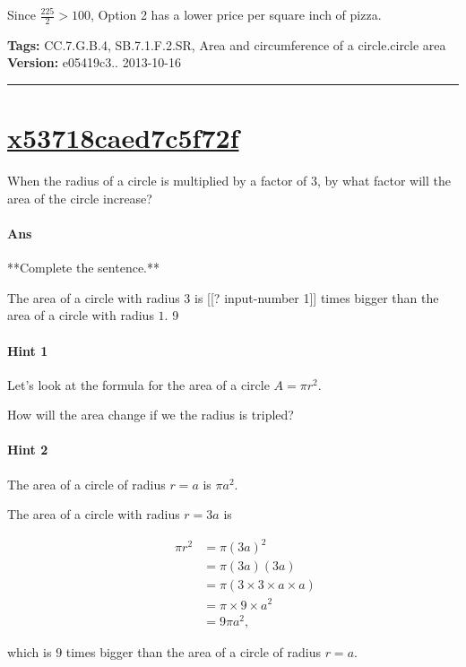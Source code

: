 \documentclass[twocolumn,10pt]{article}
\begin{document}
Since $\frac{225}{2} > 100$, Option 2 has a lower price per square inch of pizza.



\medskip
\noindent
\textbf{Tags:} {\footnotesize CC.7.G.B.4, SB.7.1.F.2.SR, Area and circumference of a circle.circle area}\\
\textbf{Version:} e05419c3.. 2013-10-16
\smallskip\hrule





\section{\href{https://www.khanacademy.org/devadmin/content/items/x53718caed7c5f72f}{x53718caed7c5f72f}}

\noindent
When the radius of a circle is multiplied by a factor of $3$, by what factor will the area of the circle increase?

\paragraph{Ans} **Complete the sentence.**

The area of a circle with radius $3$ is [[? input-number 1]] times bigger than the area of a circle with radius $1$.  9

\paragraph{Hint 1}Let's look at the formula for the area of a circle $A=\pi r^2$.  

How will the area change if we the radius is tripled?

\paragraph{Hint 2}The area of a circle of radius $r=a$ is $\pi a^2$.

The area of a circle with radius $r=3a$ is 

\begin{align*}
\qquad 
 \pi r^2 & =\pi (3a)^2  \\
  & =\pi(3a)(3a) \\
  &=\pi(3 \times 3 \times a \times a)  \\
   &= \pi \times 9 \times a^2 \\
   &= 9\pi a^2,
\end{align*} 

which is $9$ times bigger than the area of a circle of radius $r=a$. 
\end{document}
